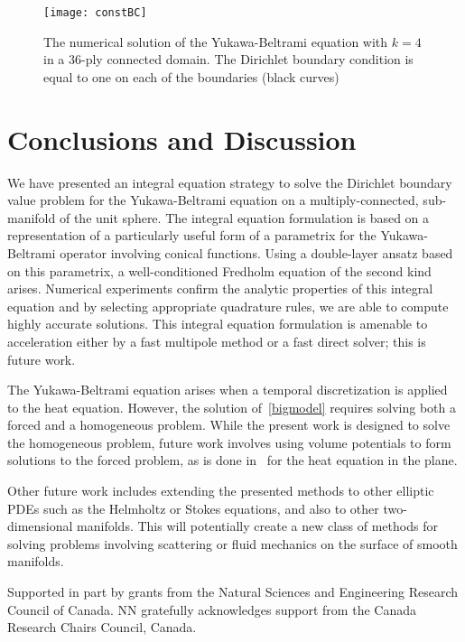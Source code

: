 \begin{figure}
  \centering
  \texttt{[image: constBC]}
  \caption{\label{f:36ply} The numerical solution of the Yukawa-Beltrami
  equation with $k=4$ in a 36-ply connected domain.  The Dirichlet
  boundary condition is equal to one on each of the boundaries (black
  curves)}
\end{figure}

\section{Conclusions and Discussion}
We have presented an integral equation strategy to solve the Dirichlet
boundary value problem for the Yukawa-Beltrami equation on a
multiply-connected, sub-manifold of the unit sphere.  The integral
equation formulation is based on a representation of a particularly
useful form of a parametrix for the Yukawa-Beltrami operator involving
conical functions.  Using a double-layer ansatz based on this
parametrix, a well-conditioned Fredholm equation of the second kind
arises.  Numerical experiments confirm the analytic properties of this
integral equation and by selecting appropriate quadrature rules, we are
able to compute highly accurate solutions.  This integral equation
formulation is amenable to acceleration either by a fast multipole
method or a fast direct solver; this is future work.  

The Yukawa-Beltrami equation arises when a temporal discretization is
applied to the heat equation.  However, the solution of~\eqref{bigmodel}
requires solving both a forced and a homogeneous problem.  While the
present work is designed to solve the homogeneous problem, future work
involves using volume potentials to form solutions to the forced
problem, as is done in~\cite{rothe:heat} for the heat equation in the
plane.

Other future work includes extending the presented methods to other
elliptic PDEs such as the Helmholtz or Stokes equations, and also to
other two-dimensional manifolds.  This will potentially create a new
class of methods for solving problems involving scattering or fluid
mechanics on the surface of smooth manifolds.

\begin{acknowledgements}
Supported in part by grants from the Natural Sciences and Engineering
Research Council of Canada. NN gratefully acknowledges support from the
Canada Research Chairs Council, Canada.
\end{acknowledgements}







